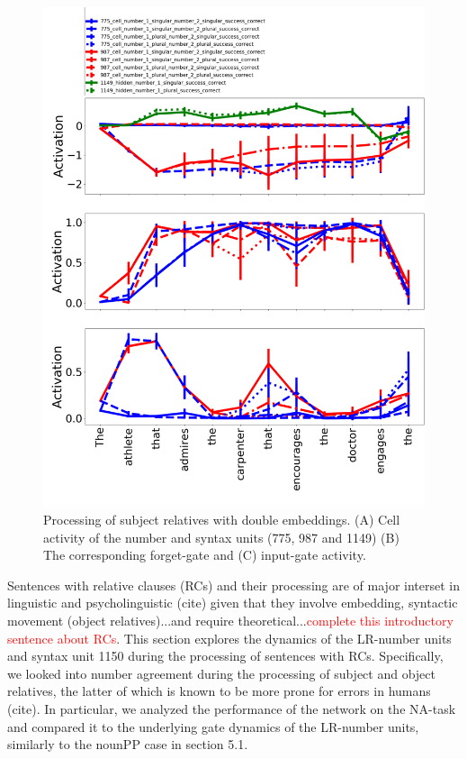 \begin{figure}[b]
\centering
\includegraphics[width=\linewidth]{Figures/Figure9_doubleRC.png}
\caption{Processing of subject relatives with double embeddings. (A) Cell activity of the number and syntax units (775, 987 and 1149) (B) The corresponding forget-gate and (C) input-gate activity.}
\end{figure}

Sentences with relative clauses (RCs) and their processing are of major interset in linguistic and psycholinguistic (cite) given that they involve embedding, syntactic movement (object relatives)...and require theoretical...\textcolor{red}{complete this introductory sentence about RCs}. This section explores the dynamics of the LR-number units and syntax unit 1150 during the processing of sentences with RCs. Specifically, we looked into number agreement during the processing of subject and object relatives, the latter of which is known to be more prone for errors in humans (cite). In particular, we analyzed the performance of the network on the NA-task and compared it to the underlying gate dynamics of the LR-number units, similarly to the nounPP case in section 5.1. 

